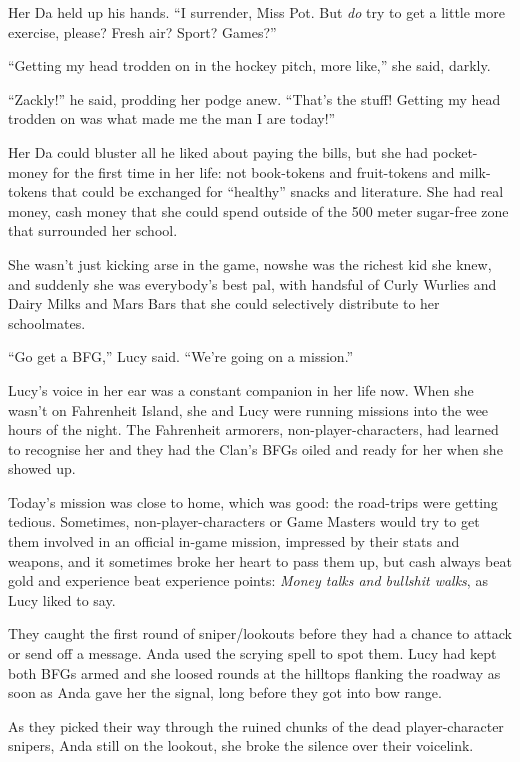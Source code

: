 Her Da held up his hands. “I surrender, Miss Pot. But \emph{do} try
to get a little more exercise, please? Fresh air? Sport? Games?”

“Getting my head trodden on in the hockey pitch, more like,” she
said, darkly.

“Zackly!” he said, prodding her podge anew. “That’s the stuff!
Getting my head trodden on was what made me the man I are today!”

Her Da could bluster all he liked about paying the bills, but she
had pocket-money for the first time in her life: not book-tokens
and fruit-tokens and milk-tokens that could be exchanged for
“healthy” snacks and literature. She had real money, cash money
that she could spend outside of the 500 meter sugar-free zone that
surrounded her school.

She wasn’t just kicking arse in the game, now\dash{}she was the richest
kid she knew, and suddenly she was everybody’s best pal, with
handsful of Curly Wurlies and Dairy Milks and Mars Bars that she
could selectively distribute to her schoolmates.

\tb

“Go get a BFG,” Lucy said. “We’re going on a mission.”

Lucy’s voice in her ear was a constant companion in her life now.
When she wasn’t on Fahrenheit Island, she and Lucy were running
missions into the wee hours of the night. The Fahrenheit armorers,
non-player-characters, had learned to recognise her and they had
the Clan’s BFGs oiled and ready for her when she showed up.

Today’s mission was close to home, which was good: the road-trips
were getting tedious. Sometimes, non-player-characters or Game
Masters would try to get them involved in an official in-game
mission, impressed by their stats and weapons, and it sometimes
broke her heart to pass them up, but cash always beat gold and
experience beat experience points:
\emph{Money talks and bullshit walks}, as Lucy liked to say.

They caught the first round of sniper/lookouts before they had a
chance to attack or send off a message. Anda used the scrying spell
to spot them. Lucy had kept both BFGs armed and she loosed rounds
at the hilltops flanking the roadway as soon as Anda gave her the
signal, long before they got into bow range.

As they picked their way through the ruined chunks of the dead
player-character snipers, Anda still on the lookout, she broke the
silence over their voicelink.

